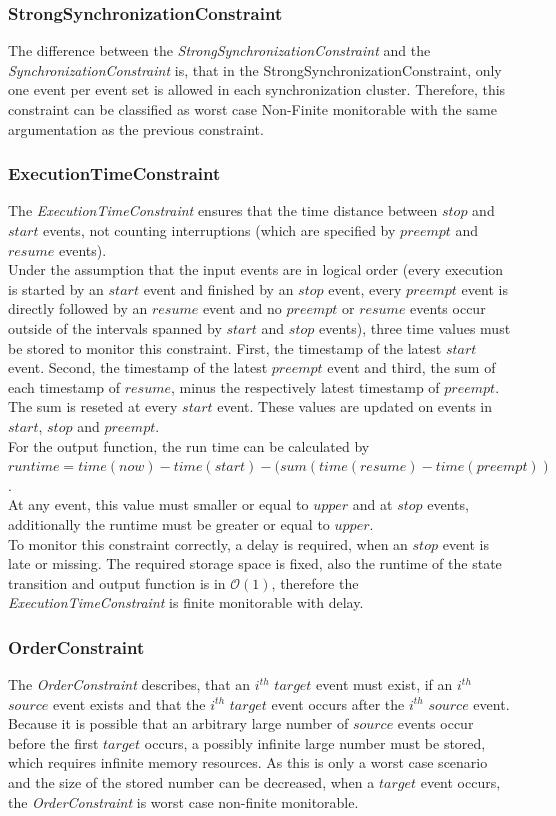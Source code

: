 	
\subsubsection{StrongSynchronizationConstraint}
	The difference between the \emph{StrongSynchronizationConstraint} and the \emph{SynchronizationConstraint} is, that in the StrongSynchronizationConstraint, only one event per event set is allowed in each synchronization cluster. Therefore, this constraint can be classified as worst case Non-Finite monitorable with the same argumentation as the previous constraint.
	
	
\subsubsection{ExecutionTimeConstraint}
	The \emph{ExecutionTimeConstraint} ensures that the time distance between $stop$ and $start$ events, not counting interruptions (which are specified by $preempt$ and $resume$ events).\\
	Under the assumption that the input events are in logical order (every execution is started by an $start$ event and finished by an $stop$ event, every $preempt$ event is directly followed by an $resume$ event and no $preempt$ or $resume$ events occur outside of the intervals spanned by $start$ and $stop$ events), three time values must be stored to monitor this constraint. First, the timestamp of the latest $start$ event. Second, the timestamp of the latest $preempt$ event and third, the sum of each timestamp of $resume$, minus the respectively latest timestamp of $preempt$. The sum is reseted at every $start$ event. 
	These values are updated on events in $start$, $stop$ and $preempt$.\\
	For the output function, the run time can be calculated by\\ $runtime = time(now) - time(start) - (sum(time(resume) - time(preempt))$.\\ At any event, this value must smaller or equal to $upper$ and at $stop$ events, additionally the runtime must be greater or equal to $upper$. \\
	To monitor this constraint correctly, a delay is required, when an $stop$ event is late or missing. The required storage space is fixed, also the runtime of the state transition and output function is in $\mathcal{O}(1)$, therefore the \emph{ExecutionTimeConstraint} is finite monitorable with delay.


\subsubsection{OrderConstraint}
	The \emph{OrderConstraint} describes, that an $i^{th}$ $target$ event must exist, if an $i^{th}$ $source$ event exists and that the $i^{th}$ $target$ event occurs after the $i^{th}$ $source$ event. Because it is possible that an arbitrary large number of $source$ events occur before the first $target$ occurs, a possibly infinite large number must be stored, which requires infinite memory resources. As this is only a worst case scenario and the size of the stored number can be decreased, when a $target$ event occurs, the \emph{OrderConstraint} is worst case non-finite monitorable.
	
